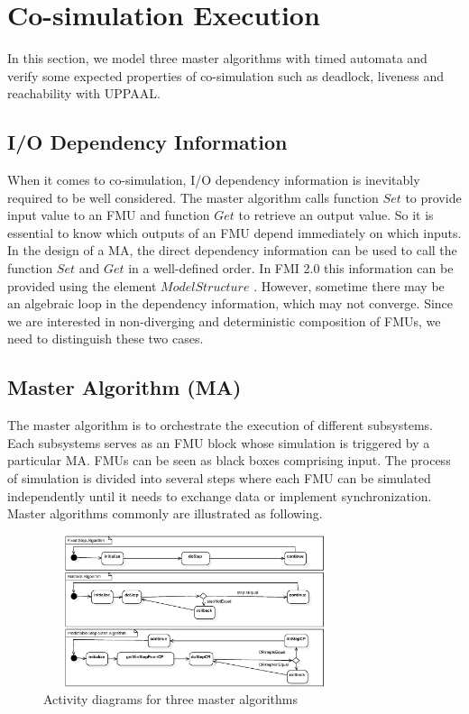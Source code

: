 \section{Co-simulation Execution}
\label{sec:ma}
In this section, we model three master algorithms with timed automata  and verify some expected properties of co-simulation such as deadlock, liveness and reachability with UPPAAL.
\subsection{I/O Dependency Information}
When it comes to co-simulation, I/O dependency information \cite{BromanBGLMTW13} is inevitably required to be well considered. The master algorithm calls function $Set$ to provide input value to an FMU and function $Get$ to retrieve an output value. So it is essential to know which outputs of an FMU depend immediately on which inputs. In the design of a MA, the direct dependency information can be used to call the function $Set$ and $Get$ in a well-defined order. In FMI 2.0 this information can be provided using the element $ModelStructure$ \cite{FMI2INTRO}. However, sometime there may be an algebraic loop in the dependency information, which may not converge. Since we are interested in non-diverging and deterministic composition of FMUs, we need to distinguish these two cases. 
\subsection{Master Algorithm (MA)}
The master algorithm is to orchestrate the execution of different subsystems. Each subsystems serves as an FMU block whose simulation is triggered by a particular MA. FMUs can be seen as black boxes comprising input. The process of simulation is divided into several steps where each FMU can be simulated independently until it needs to exchange data or implement synchronization. Master algorithms commonly are illustrated as following.
\begin{figure}[htbp]
\begin{center}
\includegraphics[width=3.5in,height=1.75in]{fig/MA.jpg}
\caption{Activity diagrams for three master algorithms}
\label{ad-fixedstep}
\end{center}
\end{figure}
